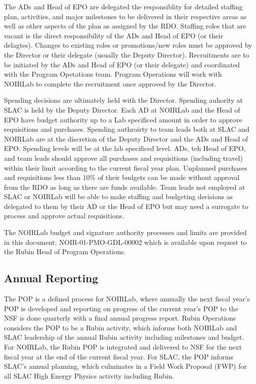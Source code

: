 The ADs and Head of EPO are delegated the responsiblity for detailed staffing plan, activities, and major milestones to be delivered in their respective areas as well as other aspects of the plan as assigned by the RDO. Staffing roles that are vacant is the direct responsibility of the ADs and Head of EPO (or their delagtes). Changes to existing roles or promotions/new roles must be approved by the Director or their delegate (usually the Deputy Director). Recruitments are to be initiated by the ADs and Head of EPO (or their delegate) and coordinated with the Program Opetations team. Program Operations will work with NOIRLab to complete the recruitment once approved by the Director.

Spending decisions are ultimately held with the Director. Spending auhority at SLAC is held by the Deputy Director. Each AD at NOIRLab and the Head of EPO have budget authority up to a Lab specificed amount in order to approve requisitions and purchases. Spending authroirty to team leads both at SLAC and NOIRLab are at the discretion of the Deputy Director and the ADs and Head of EPO. Spending levels will be at the lab specificed level. ADs, teh Head of EPO, and team leads should approve all purchases and requisitions (including travel) within their limit according to the current fiscal year plan. Unplanned purchases and requisitions less than 10\% of their budgets can be made without approval from the RDO as long as there are funds available. Team leads not employed at SLAC or NOIRLab will be able to make staffing and budgeting decisions as delegated to them by their AD or the Head of EPO but may need a surrogate to process and approve actual requisitions.

The NOIRLab budget and signature authority processes and limits are provided in this document: NOIR-01-PMO-GDL-00002 which is available upon request to the Rubin Head of Program Operations.

\subsection{Annual Reporting}
\label{sec:reporting}

The \gls{POP} is a defined process for \gls{NOIRLab}, where annually the next fiscal year's \gls{POP} is developed and reporting on progress of the current year's \gls{POP} to the \gls{NSF} is done quarterly with a final annual progress report.
Rubin Operations considers the \gls{POP} to be a Rubin activity, which informs both \gls{NOIRLab} and \gls{SLAC} leadership of the annual Rubin activity including milestones and budget.
For \gls{NOIRLab}, the Rubin \gls{POP} is integrated and delivered to \gls{NSF} for the next fiscal year at the end of the current fiscal year.
For \gls{SLAC}, the \gls{POP} informs \gls{SLAC}'s annual planning, which culminates in a Field Work Proposal (\gls{FWP}) for all \gls{SLAC} High Energy Physics activity including Rubin.

